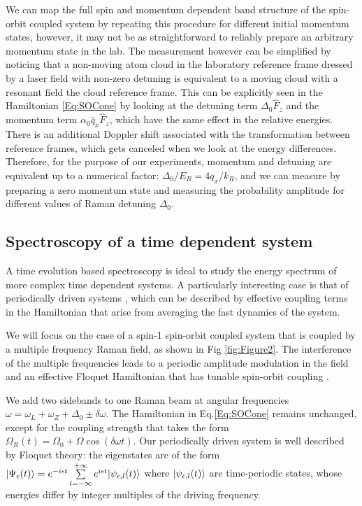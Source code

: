 We can map the full spin and momentum dependent band structure of the spin-orbit coupled system by repeating this procedure for different initial momentum states, however, it may not be as straightforward to reliably prepare an arbitrary momentum state in the lab. The measurement however can be simplified by noticing that a non-moving atom cloud in the laboratory reference frame dressed by a laser field with non-zero detuning is equivalent to a moving cloud with a resonant field the cloud reference frame. This can be explicitly seen in the Hamiltonian \ref{Eq:SOCone} by looking at the detuning term $\Delta_0\hat{F}_z$ and the momentum term $\alpha_0\hat{q}_x\hat{F}_z$, which have the same effect in the relative energies. There is an additional Doppler shift associated with the transformation between reference frames, which gets canceled when we look at the energy differences. Therefore, for the purpose of our experiments, momentum and detuning are equivalent up to a numerical factor: $\Delta_0/E_R=4q_x/k_R$, and we can measure by preparing a zero momentum state and measuring the probability amplitude for different values of Raman detuning $\Delta_0$. 

\subsection{Spectroscopy of a time dependent system}

A time evolution based spectroscopy is ideal to study the energy spectrum of more complex time dependent systems. A particularly interesting case is that of periodically driven systems \cite{jimenez-garcia_tunable_2015,eckardt_superfluid-insulator_2005,goldman_periodically_2014}, which can be described by effective coupling terms in the Hamiltonian that arise from averaging the fast dynamics of the system. %

We will focus on the case of a spin-1 spin-orbit coupled system that is coupled by a multiple frequency Raman field, as shown in Fig \ref{fig:Figure2}. The interference of the multiple frequencies leads to a periodic amplitude modulation in the field and an effective Floquet Hamiltonian that has tunable spin-orbit coupling \cite{jimenez-garcia_tunable_2015}.

We add two sidebands to one Raman beam at angular frequencies $\omega=\omega_L+\omega_Z+\Delta_0 \pm \delta\omega$.  The Hamiltonian in Eq.\ref{Eq:SOCone} remains unchanged, except for the coupling strength that takes the form $	\Omega_R(t)=\Omega_0 + \Omega\cos(\delta\omega t)$. Our periodically driven system is well described by Floquet theory: the eigenstates are of the form $|\Psi_{\epsilon}(t)\rangle=e^{-i\epsilon t}\sum\limits_{l=-\infty}^{+\infty}e^{i\epsilon t}|\psi_{\epsilon,l}(t)\rangle$ where $|\psi_{\epsilon,l}(t)\rangle$ are time-periodic states, whose energies differ by integer multiples of the driving frequency. 

